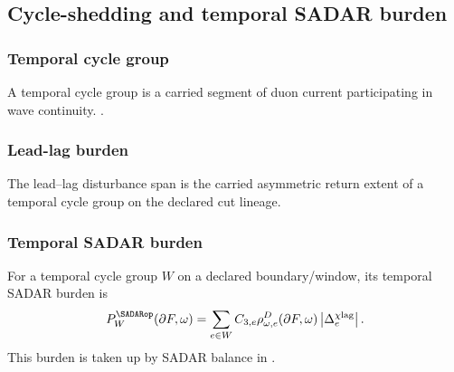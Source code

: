 \subsection{Cycle-shedding and temporal SADAR burden}
\label{sec:cycle-shedding-temporal-sadar-burden}

\subsubsection{Temporal cycle group}
\label{subsec:temporal-cycle-group}
\begin{definition}
A temporal cycle group is a carried segment of duon current participating in wave continuity. .
\end{definition}

\subsubsection{Lead-lag burden}
\label{subsec:lead-lag-burden}
\begin{definition}
The lead--lag disturbance span is the carried asymmetric return extent of a temporal cycle group on the declared cut lineage.
\end{definition}

\subsubsection{Temporal SADAR burden}
\label{subsec:temporal-sadar-burden}
For a temporal cycle group \(W\) on a declared boundary/window, its temporal SADAR burden is
\begin{equation}
P^{\SADARop}_{W}(\partial F,\omega)=
\sum_{e\in W}
C_{3,e}
\rho^D_{\omega,e}(\partial F,\omega)
\left|\Delta^{\chi\mathrm{lag}}_e\right|.
\label{eq:temporal-sadar-burden}
\end{equation}
This burden is taken up by SADAR balance in .

